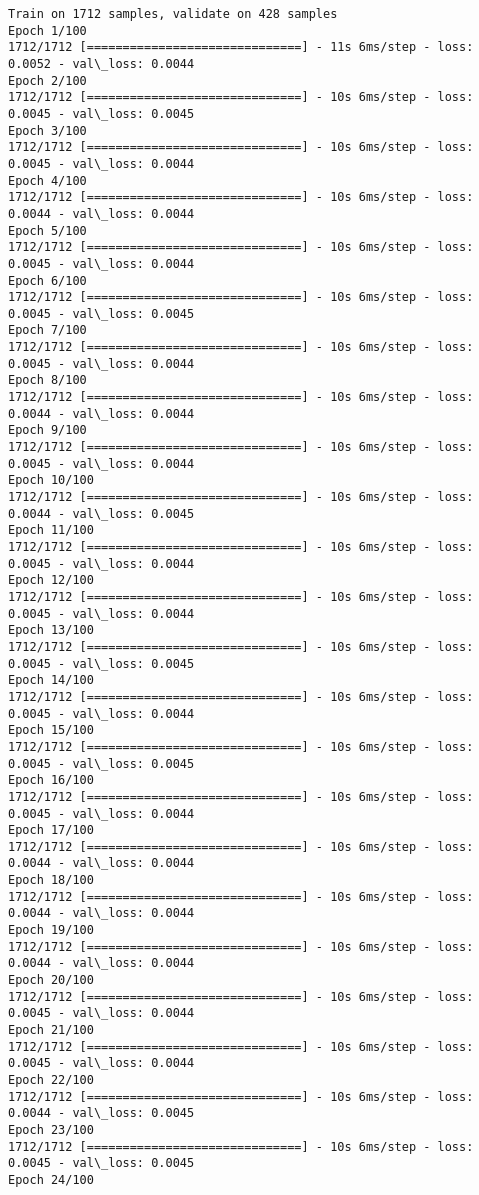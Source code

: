 \documentclass[11pt]{article}
\begin{document}
    \begin{Verbatim}[commandchars=\\\{\}]
Train on 1712 samples, validate on 428 samples
Epoch 1/100
1712/1712 [==============================] - 11s 6ms/step - loss: 0.0052 - val\_loss: 0.0044
Epoch 2/100
1712/1712 [==============================] - 10s 6ms/step - loss: 0.0045 - val\_loss: 0.0045
Epoch 3/100
1712/1712 [==============================] - 10s 6ms/step - loss: 0.0045 - val\_loss: 0.0044
Epoch 4/100
1712/1712 [==============================] - 10s 6ms/step - loss: 0.0044 - val\_loss: 0.0044
Epoch 5/100
1712/1712 [==============================] - 10s 6ms/step - loss: 0.0045 - val\_loss: 0.0044
Epoch 6/100
1712/1712 [==============================] - 10s 6ms/step - loss: 0.0045 - val\_loss: 0.0045
Epoch 7/100
1712/1712 [==============================] - 10s 6ms/step - loss: 0.0045 - val\_loss: 0.0044
Epoch 8/100
1712/1712 [==============================] - 10s 6ms/step - loss: 0.0044 - val\_loss: 0.0044
Epoch 9/100
1712/1712 [==============================] - 10s 6ms/step - loss: 0.0045 - val\_loss: 0.0044
Epoch 10/100
1712/1712 [==============================] - 10s 6ms/step - loss: 0.0044 - val\_loss: 0.0045
Epoch 11/100
1712/1712 [==============================] - 10s 6ms/step - loss: 0.0045 - val\_loss: 0.0044
Epoch 12/100
1712/1712 [==============================] - 10s 6ms/step - loss: 0.0045 - val\_loss: 0.0044
Epoch 13/100
1712/1712 [==============================] - 10s 6ms/step - loss: 0.0045 - val\_loss: 0.0045
Epoch 14/100
1712/1712 [==============================] - 10s 6ms/step - loss: 0.0045 - val\_loss: 0.0044
Epoch 15/100
1712/1712 [==============================] - 10s 6ms/step - loss: 0.0045 - val\_loss: 0.0045
Epoch 16/100
1712/1712 [==============================] - 10s 6ms/step - loss: 0.0045 - val\_loss: 0.0044
Epoch 17/100
1712/1712 [==============================] - 10s 6ms/step - loss: 0.0044 - val\_loss: 0.0044
Epoch 18/100
1712/1712 [==============================] - 10s 6ms/step - loss: 0.0044 - val\_loss: 0.0044
Epoch 19/100
1712/1712 [==============================] - 10s 6ms/step - loss: 0.0044 - val\_loss: 0.0044
Epoch 20/100
1712/1712 [==============================] - 10s 6ms/step - loss: 0.0045 - val\_loss: 0.0044
Epoch 21/100
1712/1712 [==============================] - 10s 6ms/step - loss: 0.0045 - val\_loss: 0.0044
Epoch 22/100
1712/1712 [==============================] - 10s 6ms/step - loss: 0.0044 - val\_loss: 0.0045
Epoch 23/100
1712/1712 [==============================] - 10s 6ms/step - loss: 0.0045 - val\_loss: 0.0045
Epoch 24/100

\end{Verbatim}
\end{document}
